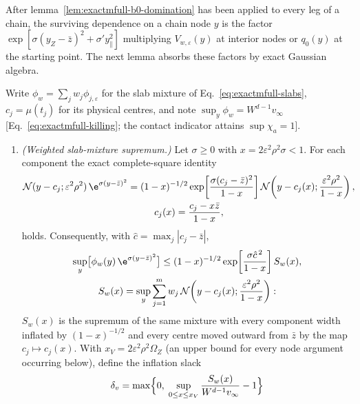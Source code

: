 After lemma~\ref{lem:exactmfull-b0-domination} has been applied to every
leg of a chain, the surviving dependence on a chain node \(y\) is the
factor
\(\exp[\sigma(y_Z-\bar z)^2+\sigma'y_\parallel^2]\)
multiplying \(V_{w,\varepsilon}(y)\) at interior nodes or \(q_0(y)\) at the
starting point.  The next lemma absorbs these factors by exact Gaussian
algebra.

\begin{lemma}
\label{lem:exactmfull-b0-absorption}
Write \(\phi_w=\sum_jw_j\phi_{j,\varepsilon}\) for the slab mixture of
Eq.~\eqref{eq:exactmfull-slabs}, \(c_j=\mu(t_j)\) for its physical centres,
and note \(\sup_y\phi_w=W^{d-1}v_\infty\)
[Eq.~\eqref{eq:exactmfull-killing}; the contact indicator attains
\(\sup\chi_a=1\)].
\begin{enumerate}
\item[(a)] \emph{(Weighted slab-mixture supremum.)}
Let \(\sigma\ge0\) with \(x=2\varepsilon^2\rho^2\sigma<1\).  For each
component the exact complete-square identity
\begin{equation}
 \begin{gathered}
 \mathcal N(y-c_j;\varepsilon^2\rho^2)\,
 \e^{\sigma(y-\bar z)^2}
 =(1-x)^{-1/2}
 \exp\!\left[\frac{\sigma(c_j-\bar z)^2}{1-x}\right]
 \mathcal N\!\left(y-c_j(x);\frac{\varepsilon^2\rho^2}{1-x}\right),\\
 c_j(x)=\frac{c_j-x\bar z}{1-x},
 \end{gathered}
 \label{eq:exactmfull-b0-square}
\end{equation}
holds.  Consequently, with
\(\hat c=\max_j|c_j-\bar z|\),
\begin{equation}
 \begin{gathered}
 \sup_y\bigl[\phi_w(y)\,\e^{\sigma(y-\bar z)^2}\bigr]
 \le(1-x)^{-1/2}
 \exp\!\left[\frac{\sigma\hat c^{\,2}}{1-x}\right]
 S_w(x),\\
 S_w(x)=\sup_y\sum_{j=1}^m w_j\,
 \mathcal N\!\left(y-c_j(x);\frac{\varepsilon^2\rho^2}{1-x}\right):
 \end{gathered}
 \label{eq:exactmfull-b0-Sw}
\end{equation}
\(S_w(x)\) is the supremum of the same mixture with every component width
inflated by \((1-x)^{-1/2}\) and every centre moved outward from \(\bar z\)
by the map \(c_j\mapsto c_j(x)\).  With \(x_V=2\varepsilon^2\rho^2\Omega_Z\)
(an upper bound for every node argument occurring below), define the
inflation slack
\begin{equation}
 \delta_v
 =\max\Bigl\{0,\;
 \sup_{0\le x\le x_V}\frac{S_w(x)}{W^{d-1}v_\infty}-1\Bigr\}

\end{equation}
\end{enumerate}
\end{lemma}
